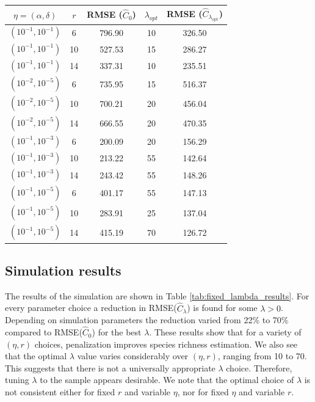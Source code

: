 \documentclass[oupdraft]{bio}
\begin{document}
\begin{table}[h]
\centering
\begin{tabular}{ccccc}
  \hline
$\eta = (\alpha, \delta)$ & $r$ & RMSE ($\widehat{C}_{0}$) & $\lambda_{opt}$ & RMSE ($\widehat{C}_{\lambda_{ \text{opt}}}$) \\
  \hline
$\left(10^{-1}, 10^{-1}\right)$ &   6 & 796.90 &  10 & 326.50 \\
$\left(10^{-1}, 10^{-1}\right)$ &  10 & 527.53 &  15 & 286.27 \\
  $\left(10^{-1}, 10^{-1}\right)$ &  14 & 337.31 &  10 & 235.51 \\
  $\left(10^{-2}, 10^{-5}\right)$ &   6 & 735.95 &  15 & 516.37 \\
  $\left(10^{-2}, 10^{-5}\right)$ &  10 & 700.21 &  20 & 456.04 \\
  $\left(10^{-2}, 10^{-5}\right)$ &  14 & 666.55 &  20 & 470.35 \\
  $\left(10^{-1}, 10^{-3}\right)$ &   6 & 200.09 &  20 & 156.29 \\
  $\left(10^{-1}, 10^{-3}\right)$ &  10 & 213.22 &  55 & 142.64 \\
  $\left(10^{-1}, 10^{-3}\right)$ &  14 & 243.42 &  55 & 148.26 \\
  $\left(10^{-1}, 10^{-5}\right)$ &   6 & 401.17 &  55 & 147.13 \\
  $\left(10^{-1}, 10^{-5}\right)$ &  10 & 283.91 &  25 & 137.04 \\
  $\left(10^{-1}, 10^{-5}\right)$ &  14 & 415.19 &  70 & 126.72 \\
   \hline
\end{tabular}
\end{table}

\subsection{Simulation results} \label{sec:first_sim}

The results of the simulation are shown in Table \ref{tab:fixed_lambda_results}.  For every parameter choice a reduction in RMSE($\widehat{C}_{\lambda}$) is found for some $\lambda > 0$.  Depending on simulation parameters the reduction varied from 22\% to 70\% compared to RMSE($\widehat{C}_{0}$) for the best $\lambda$.  These results show that for a variety of $(\eta, r)$ choices, penalization improves species richness estimation.
We also see that the optimal $\lambda$ value varies considerably over $(\eta, r)$, ranging from 10 to 70.  This suggests that there is not a universally appropriate $\lambda$ choice. Therefore, tuning $\lambda$ to the sample appears desirable. We note that the optimal choice of $\lambda$ is not consistent either for fixed $r$ and variable $\eta$, nor for fixed $\eta$ and variable $r$.
\end{document}
